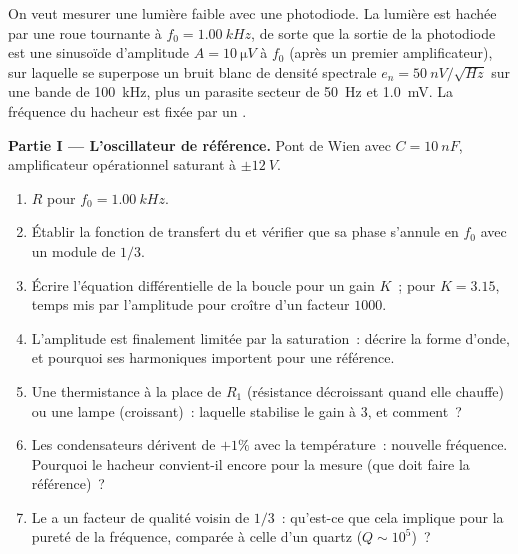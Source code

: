 \begin{problem}
\label{pb:b2:feedback-oscillators:1}

On veut mesurer une lumière faible avec une photodiode. La lumière est hachée
par une roue tournante à $f_0 = \qty{1.00}{kHz}$, de sorte que la sortie de la photodiode
est une sinusoïde d'amplitude $A = \qty{10}{\micro V}$ à $f_0$ (après un
premier amplificateur), sur laquelle se superpose un bruit blanc de densité spectrale
$e_n = \qty{50}{nV/\sqrt{Hz}}$ sur une bande de \qty{100}{kHz}, plus un
parasite secteur de \qty{50}{Hz} et \qty{1.0}{mV}. La fréquence du hacheur est
fixée par un .

\medskip
\noindent\textbf{Partie I --- L'oscillateur de référence.}
Pont de Wien avec $C = \qty{10}{nF}$, amplificateur opérationnel saturant à $\pm\qty{12}{V}$.
\begin{enumerate}
  \item $R$ pour $f_0 = \qty{1.00}{kHz}$.
  \item Établir la fonction de transfert du  et vérifier
        que sa phase s'annule en $f_0$ avec un module de $1/3$.
  \item Écrire l'équation différentielle de la boucle pour un gain $K$~; pour
        $K = 3.15$, temps mis par l'amplitude pour croître d'un facteur $1000$.
  \item L'amplitude est finalement limitée par la saturation~: décrire la
        forme d'onde, et pourquoi ses harmoniques importent pour une référence.
  \item Une thermistance à la place de $R_1$ (résistance décroissant quand elle
        chauffe) ou une lampe (croissant)~: laquelle stabilise le gain à 3,
        et comment~?
  \item Les condensateurs dérivent de $+1\%$ avec la température~: nouvelle fréquence.
        Pourquoi le hacheur convient-il encore pour la mesure (que
        doit faire la référence)~?
  \item Le  a un facteur de qualité voisin de $1/3$~: qu'est-ce que
        cela implique pour la pureté de la fréquence, comparée à celle d'un
        quartz ($Q \sim 10^5$)~?
\end{enumerate}


\end{problem}
